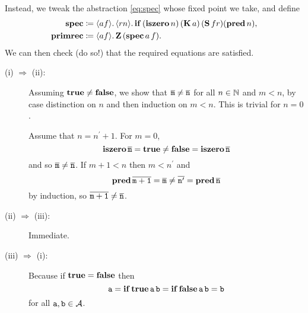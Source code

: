Instead, we tweak the abstraction \eqref{eq:spec} whose fixed point we take,
and define
\begin{align*}
\spec & \defeq
\lambdapca{af}{\lambdapca{rn}{
  \pcaif \, (\pcaiszero n) \, (\kcomb a) \, (\scomb f r)
    (\pcapred n)
}}, \\
\pcarec & \defeq \lambdapca{af}{\pcaz \, (\spec a \, f)}.
\end{align*}
We can then check (do so!) that the required equations are satisfied.




\begin{description}

\item[(i) \(\Longrightarrow\) (ii):]
  Assuming \(\pcatrue \neq \pcafalse\), we show that
  \(\numeral{m} \neq \numeral{n}\) for all \(n \in \Nat\) and \(m < n\),
  by case distinction on \(n\) and then induction on \(m < n\).
  This is trivial for \(n = 0\).

  Assume that \(n = n^\prime + 1\).
  For \(m = 0\),
  \[ \pcaiszero \numeral{m} = \pcatrue \neq \pcafalse = \pcaiszero \numeral{n} \]
  and so \(\numeral m \neq \numeral n\).
  If \(m+1 < n\) then \(m < n^\prime\) and
  \[ \pcapred \numeral{m+1} = \numeral m
    \neq \numeral{n^\prime} = \pcapred \numeral{n} \]
  by induction, so \(\numeral{m+1} \neq \numeral n\).

\item[(ii) \(\Longrightarrow\) (iii):]
  Immediate.

\item[(iii) \(\Longrightarrow\) (i):]
  Because if \(\pcatrue = \pcafalse\) then
  \[ \pca a = \pcaif \pcatrue \pca{a} \pca{b} =
    \pcaif \pcafalse \pca{a} \pca{b} = \pca b \]
  for all \(\pca a, \pca b \in \AA\).

\end{description}